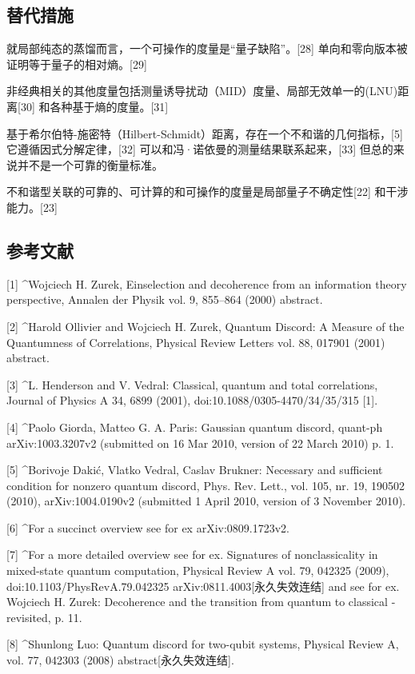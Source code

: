 \subsection{ 替代措施}
就局部纯态的蒸馏而言，一个可操作的度量是“量子缺陷”。[28] 单向和零向版本被证明等于量子的相对熵。[29]

非经典相关的其他度量包括测量诱导扰动（MID）度量、局部无效单一的(LNU)距离[30] 和各种基于熵的度量。[31]

基于希尔伯特-施密特（Hilbert-Schmidt）距离，存在一个不和谐的几何指标，[5] 它遵循因式分解定律，[32] 可以和冯·诺依曼的测量结果联系起来，[33] 但总的来说并不是一个可靠的衡量标准。

不和谐型关联的可靠的、可计算的和可操作的度量是局部量子不确定性[22] 和干涉能力。[23]

\subsection{参考文献}
[1]
^Wojciech H. Zurek, Einselection and decoherence from an information theory perspective, Annalen der Physik vol. 9, 855–864 (2000) abstract.

[2]
^Harold Ollivier and Wojciech H. Zurek, Quantum Discord: A Measure of the Quantumness of Correlations, Physical Review Letters vol. 88, 017901 (2001) abstract.

[3]
^L. Henderson and V. Vedral: Classical, quantum and total correlations, Journal of Physics A 34, 6899 (2001), doi:10.1088/0305-4470/34/35/315 [1].

[4]
^Paolo Giorda, Matteo G. A. Paris: Gaussian quantum discord, quant-ph arXiv:1003.3207v2 (submitted on 16 Mar 2010, version of 22 March 2010) p. 1.

[5]
^Borivoje Dakić, Vlatko Vedral, Caslav Brukner: Necessary and sufficient condition for nonzero quantum discord, Phys. Rev. Lett., vol. 105, nr. 19, 190502 (2010), arXiv:1004.0190v2 (submitted 1 April 2010, version of 3 November 2010).

[6]
^For a succinct overview see for ex arXiv:0809.1723v2.

[7]
^For a more detailed overview see for ex. Signatures of nonclassicality in mixed-state quantum computation, Physical Review A vol. 79, 042325 (2009), doi:10.1103/PhysRevA.79.042325 arXiv:0811.4003[永久失效连结] and see for ex. Wojciech H. Zurek: Decoherence and the transition from quantum to classical - revisited, p. 11.

[8]
^Shunlong Luo: Quantum discord for two-qubit systems, Physical Review A, vol. 77, 042303 (2008) abstract[永久失效连结].

